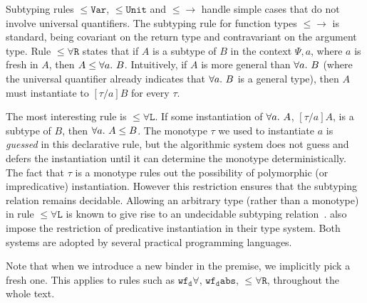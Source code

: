 Subtyping rules $\mathtt{{\le}Var}$, $\mathtt{{\le}Unit}$ and $\mathtt{{\le}{\to}}$
handle simple cases that do not involve universal quantifiers.
The subtyping rule for function types $\mathtt{{\le}{\to}}$ is standard,
being covariant on the return type and contravariant on the argument type.
Rule $\mathtt{{\le}\forall R}$ states that if $A$ is a subtype of $B$
in the context $\Psi, a$, where $a$ is fresh in $A$, then $A\le\all B$.
Intuitively, if $A$ is more general than $\all B$ (where the universal quantifier
already indicates that $\all B$ is a general type),
then $A$ must instantiate to $[\tau/a]B$ for every $\tau$.

The most interesting rule is $\mathtt{{\le}\forall L}$.
If some instantiation of $\all A$, $[\tau/a]A$, is a subtype of $B$,
then $\all A \le B$.
The monotype $\tau$ we used to instantiate $a$ is \emph{guessed} in this
declarative rule, but the algorithmic system does not guess and defers the
instantiation until it can determine the monotype deterministically.
The fact that $\tau$ is a monotype rules out the possibility of
polymorphic (or impredicative) instantiation.
However this restriction ensures that the subtyping relation remains
decidable. Allowing an arbitrary type (rather than a monotype) in rule $\mathtt{{\le}\forall L}$
is known to give rise to an undecidable subtyping relation~\cite{tiuryn1996subtyping}.
\citet{jones2007practical} also impose the restriction of
predicative instantiation in their type system.
Both systems are adopted by several practical programming languages.

Note that when we introduce a new binder in the premise, we implicitly pick a fresh one.
This applies to rules such as $\mathtt{wf_d\forall}$, $\mathtt{wf_dabs}$, $\mathtt{{\le}\forall R}$,
throughout the whole text.

